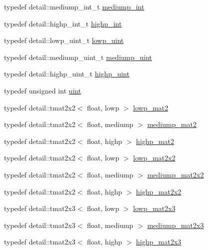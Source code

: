 \begin{CompactItemize}
\item 
typedef detail::mediump\_\-int\_\-t \hyperlink{group__core__precision_g2a3dcbcd7f4e17663d393a12061ac6ac}{mediump\_\-int}
\item 
typedef detail::highp\_\-int\_\-t \hyperlink{group__core__precision_gafed5240eb0a43328cb75faf5fb0a8c2}{highp\_\-int}
\item 
typedef detail::lowp\_\-uint\_\-t \hyperlink{group__core__precision_g8077c90f2c87e419ea6c273157dcc1fc}{lowp\_\-uint}
\item 
typedef detail::mediump\_\-uint\_\-t \hyperlink{group__core__precision_g08ae38ad78ade3539fdd1d25052b8c51}{mediump\_\-uint}
\item 
typedef detail::highp\_\-uint\_\-t \hyperlink{group__core__precision_gbfd1cf11193324a5f77d3831b6ac3205}{highp\_\-uint}
\item 
typedef unsigned int \hyperlink{group__core__precision_g4fd29415871152bfb5abd588334147c8}{uint}
\item 
typedef detail::tmat2x2$<$ float, lowp $>$ \hyperlink{group__core__precision_gc0acc3ccf8da050af3393ea639f698d6}{lowp\_\-mat2}
\item 
typedef detail::tmat2x2$<$ float, mediump $>$ \hyperlink{group__core__precision_g6ed8bfa67b72cea216cb558411f95f86}{mediump\_\-mat2}
\item 
typedef detail::tmat2x2$<$ float, highp $>$ \hyperlink{group__core__precision_gb9884251d84b95dbbf27aa1e4b3a1ec7}{highp\_\-mat2}
\item 
typedef detail::tmat2x2$<$ float, lowp $>$ \hyperlink{group__core__precision_g7d7e123d953978cc17de6882bb10400e}{lowp\_\-mat2x2}
\item 
typedef detail::tmat2x2$<$ float, mediump $>$ \hyperlink{group__core__precision_g867b486aea2d228a1e1a134af73b2c4b}{mediump\_\-mat2x2}
\item 
typedef detail::tmat2x2$<$ float, highp $>$ \hyperlink{group__core__precision_g694146b8d430b22caa8b37571d9bc8bc}{highp\_\-mat2x2}
\item 
typedef detail::tmat2x3$<$ float, lowp $>$ \hyperlink{group__core__precision_gef481e637af5103a83ab561d30d28f2a}{lowp\_\-mat2x3}
\item 
typedef detail::tmat2x3$<$ float, mediump $>$ \hyperlink{group__core__precision_gd4e099c0dfa8f35ce9c0ddc8605428cf}{mediump\_\-mat2x3}
\item 
typedef detail::tmat2x3$<$ float, highp $>$ \hyperlink{group__core__precision_g7d4e5a1c803be5688c75241c924dfa58}{highp\_\-mat2x3}
\item 

\end{CompactItemize}
